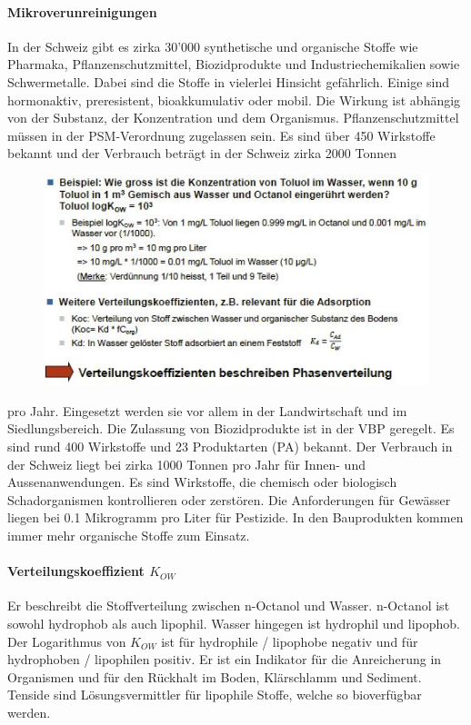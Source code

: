 \documentclass[9pt, openright=false]{scrartcl}
\begin{document}
\paragraph{Mikroverunreinigungen}  In der Schweiz gibt es zirka 30'000 synthetische und organische Stoffe wie Pharmaka, Pflanzenschutzmittel, Biozidprodukte und Industriechemikalien sowie Schwermetalle. Dabei sind die Stoffe in vielerlei Hinsicht gefährlich. Einige sind hormonaktiv, preresistent, bioakkumulativ oder mobil. Die Wirkung ist abhängig von der Substanz, der Konzentration und dem Organismus. Pflanzenschutzmittel müssen in der PSM-Verordnung zugelassen sein. Es sind über 450 Wirkstoffe bekannt und der Verbrauch beträgt in der Schweiz zirka 2000 Tonnen\begin{figure} 
  \includegraphics[width=.55\textwidth]{images/BeispielKOW}
\end{figure} pro Jahr. Eingesetzt werden sie vor allem in der Landwirtschaft und im Siedlungsbereich. Die Zulassung von Biozidprodukte ist in der VBP geregelt. Es sind rund 400 Wirkstoffe und 23 Produktarten (PA) bekannt. Der Verbrauch in der Schweiz liegt bei zirka 1000 Tonnen pro Jahr für Innen- und Aussenanwendungen. Es sind Wirkstoffe, die chemisch oder biologisch Schadorganismen kontrollieren oder zerstören. Die Anforderungen für Gewässer liegen bei 0.1 Mikrogramm pro Liter für Pestizide. In den Bauprodukten kommen immer mehr organische Stoffe zum Einsatz.
\paragraph{Verteilungskoeffizient $K_{OW}$} Er beschreibt die Stoffverteilung zwischen n-Octanol und Wasser. n-Octanol ist sowohl hydrophob als auch lipophil. Wasser hingegen ist hydrophil und lipophob. Der Logarithmus von $K_{OW}$ ist für hydrophile / lipophobe negativ und für hydrophoben / lipophilen positiv. Er ist ein Indikator für die Anreicherung in Organismen und für den Rückhalt im Boden, Klärschlamm und Sediment. Tenside sind Lösungsvermittler für lipophile Stoffe, welche so bioverfügbar werden. 
\end{document}
